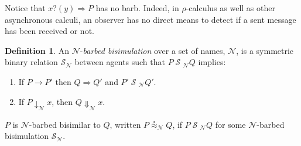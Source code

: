 \documentclass[]{amsart}
\makeatletter
\newcommand{\concat}{\Rightarrow}
\newcommand{\nameeq}{\mathbin{\equiv_N}}
\newcommand{\prefix}[3]{#1 ? ( #2 ) \concat #3}
\newcommand{\lift}[2]{#1 ! ( #2 )}
\newcommand{\quotep}[1]{@#1}
\newcommand{\red}{\rightarrow}
\newcommand{\wred}{\Rightarrow}
\newcommand{\parop}{\;|\;}		%
\newcommand{\rel}[1]{\;{\mathcal #1}\;} %
\newcommand{\wbbisim}{\stackrel{\centerdot}{\approx}} %
\newcommand{\fwbeq}{\stackrel{\circ}{\approx}}	%
\newcommand{\wbeq}{\approx}	%
\newtheorem{lem}[thm]{Lemma}
\theoremstyle{definition}
\newtheorem{defn}[thm]{Definition}
\theoremstyle{remark}
\newtheorem{rem}[thm]{Remark}
\numberwithin{equation}{subsection}
\newcommand{\rhoc}{$\rho$-calculus}
\makeatother
\begin{document}
Notice that $\prefix{x}{y}{P}$ has no barb.  Indeed, in {\rhoc} as well
as other asynchronous calculi, an observer has no direct means to
detect if a sent message has been received or not.

\begin{defn}
An  ${\mathcal N}$-\emph{barbed bisimulation} over a set of names, ${\mathcal N}$, is a symmetric binary relation 
${\mathcal S}_{\mathcal N}$ between agents such that $P\rel{S}_{\mathcal N}Q$ implies:
\begin{enumerate}
\item If $P \red P'$ then $Q \wred Q'$ and $P'\rel{S}_{\mathcal N} Q'$.
\item If $P\downarrow_{\mathcal N} x$, then $Q\Downarrow_{\mathcal N} x$.
\end{enumerate}
$P$ is ${\mathcal N}$-barbed bisimilar to $Q$, written
$P \wbbisim_{\mathcal N} Q$, if $P \rel{S}_{\mathcal N} Q$ for some ${\mathcal N}$-barbed bisimulation ${\mathcal S}_{\mathcal N}$.
\end{defn}






\end{document}
